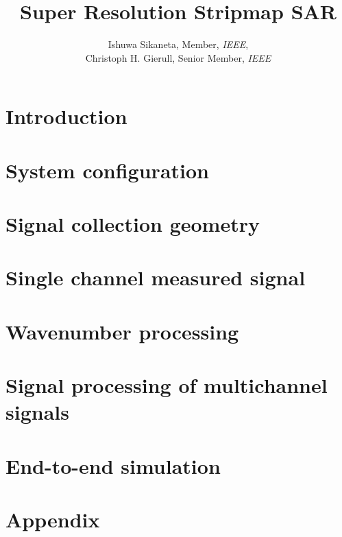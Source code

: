 \documentclass[10pt,oneside]{book}
\title{Super Resolution Stripmap SAR}
\author{Ishuwa Sikaneta, Member, \textsl{IEEE},\\ Christoph H. Gierull, Senior Member, \textsl{IEEE}}
\begin{document}
\maketitle
\tableofcontents
\chapter{Introduction}


\chapter{System configuration}


\chapter{Signal collection geometry}






\chapter{Single channel measured signal}


\chapter{Wavenumber processing}



\chapter{Signal processing of multichannel signals}


\chapter{End-to-end simulation}



\printbibliography
\appendix
\chapter{Appendix}








\end{document}
